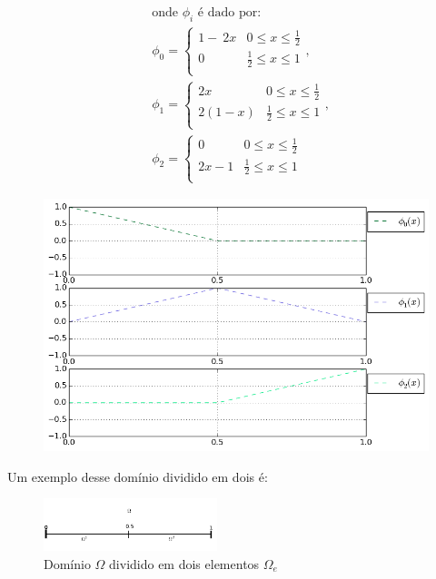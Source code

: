 \begin{figure}
  \begin{minipage}{.5\textwidth}
	\begin{align*}
	& \text{onde\ } \phi_i \text{\ é dado por:}\\
	& \phi_0=
	\begin{cases} 
	     1-\ 2x & 0 \leq x\leq \frac{1}{2} \\
	      0  & \frac{1}{2}  \leq x \leq 1 \\
	\end{cases},\\ 
	& \phi_1=
	\begin{cases} 
	     2x & 0 \leq x\leq \frac{1}{2} \\
	      2(1-x)  & \frac{1}{2}  \leq x \leq 1 \\
	\end{cases},\\
	& \phi_2=
	\begin{cases} 
	     0 & 0 \leq x\leq \frac{1}{2} \\
	     2x-1  & \frac{1}{2}  \leq x \leq 1 \\
	\end{cases}
	\end{align*}
  \end{minipage}%
  \begin{minipage}{.5\textwidth}
    \centering
     \includegraphics[width=1\textwidth, center]{figuras/phis_elementos_finitos.png}
    
  \end{minipage}
\end{figure}
 Um exemplo desse domínio dividido em dois é:
\begin{figure}[h]
 \includegraphics[width=0.45\textwidth, center]{figuras/2_elementos_finitos.png}
\caption{Domínio $\Omega$ dividido em dois elementos $\Omega_e$}
 \end{figure}\\
